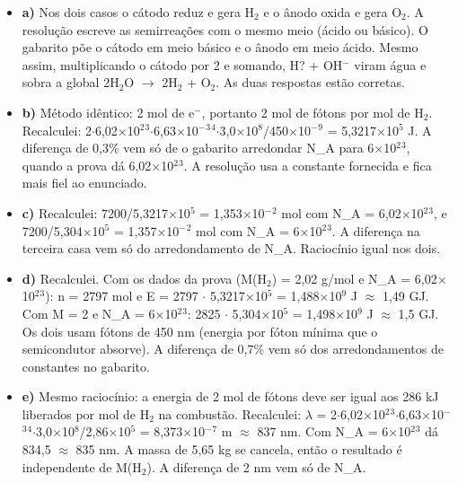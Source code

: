 \documentclass{article}%
\begin{document}
\begin{itemize}%
\item%
\textbf{a)} Nos dois casos o cátodo reduz e gera H$_{2}$ e o ânodo oxida e gera O$_{2}$. A resolução escreve as semirreações com o mesmo meio (ácido ou básico). O gabarito põe o cátodo em meio básico e o ânodo em meio ácido. Mesmo assim, multiplicando o cátodo por 2 e somando, H? + OH$^{-}$ viram água e sobra a global 2H$_{2}$O $\to$ 2H$_{2}$ + O$_{2}$. As duas respostas estão corretas.%
\item%
\textbf{b)} Método idêntico: 2 mol de e$^{-}$, portanto 2 mol de fótons por mol de H$_{2}$. Recalculei: 2$\cdot$6,02$\times$10$^2$$^3$$\cdot$6,63$\times$10$^{-}$$^3$$^{4}$$\cdot$3,0$\times$10$^{8}$/450$\times$10$^{-}$$^{9}$ = 5,3217$\times$10$^{5}$ J. A diferença de 0,3\% vem só de o gabarito arredondar N\_A para 6$\times$10$^2$$^3$, quando a prova dá 6,02$\times$10$^2$$^3$. A resolução usa a constante fornecida e fica mais fiel ao enunciado.%
\item%
\textbf{c)} Recalculei: 7200/5,3217$\times$10$^{5}$ = 1,353$\times$10$^{-}$$^2$ mol com N\_A = 6,02$\times$10$^2$$^3$, e 7200/5,304$\times$10$^{5}$ = 1,357$\times$10$^{-}$$^2$ mol com N\_A = 6$\times$10$^2$$^3$. A diferença na terceira casa vem só do arredondamento de N\_A. Raciocínio igual nos dois.%
\item%
\textbf{d)} Recalculei. Com os dados da prova (M(H$_{2}$) = 2,02 g/mol e N\_A = 6,02$\times$10$^2$$^3$): n = 2797 mol e E = 2797 $\cdot$ 5,3217$\times$10$^{5}$ = 1,488$\times$10$^{9}$ J $\approx$ 1,49 GJ. Com M = 2 e N\_A = 6$\times$10$^2$$^3$: 2825 $\cdot$ 5,304$\times$10$^{5}$ = 1,498$\times$10$^{9}$ J $\approx$ 1,5 GJ. Os dois usam fótons de 450 nm (energia por fóton mínima que o semicondutor absorve). A diferença de 0,7\% vem só dos arredondamentos de constantes no gabarito.%
\item%
\textbf{e)} Mesmo raciocínio: a energia de 2 mol de fótons deve ser igual aos 286 kJ liberados por mol de H$_{2}$ na combustão. Recalculei: $\lambda$ = 2$\cdot$6,02$\times$10$^2$$^3$$\cdot$6,63$\times$10$^{-}$$^3$$^{4}$$\cdot$3,0$\times$10$^{8}$/2,86$\times$10$^{5}$ = 8,373$\times$10$^{-}$$^{7}$ m $\approx$ 837 nm. Com N\_A = 6$\times$10$^2$$^3$ dá 834,5 $\approx$ 835 nm. A massa de 5,65 kg se cancela, então o resultado é independente de M(H$_{2}$). A diferença de 2 nm vem só de N\_A.%
\end{itemize}%
\end{document}
